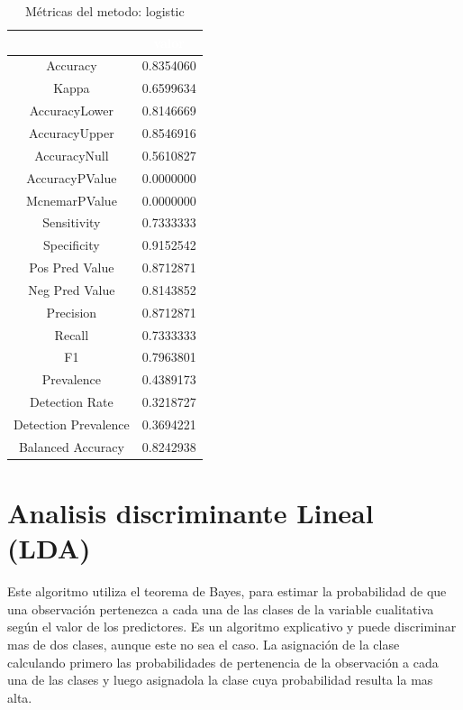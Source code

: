 \documentclass[]{article}
\begin{document}
\begin{table}[!h]

\caption{\label{tab:metricas_logistic}Métricas del metodo: logistic }
\centering
\begin{tabular}[t]{cc}
\toprule
\rowcolor{black}  \multicolumn{1}{c}{\textcolor{white}{\textbf{metricas}}} & \multicolumn{1}{c}{\textcolor{white}{\textbf{valor}}}\\
\midrule
\rowcolor{gray!6}  Accuracy & 0.8354060\\
Kappa & 0.6599634\\
\rowcolor{gray!6}  AccuracyLower & 0.8146669\\
AccuracyUpper & 0.8546916\\
\rowcolor{gray!6}  AccuracyNull & 0.5610827\\
\addlinespace
AccuracyPValue & 0.0000000\\
\rowcolor{gray!6}  McnemarPValue & 0.0000000\\
Sensitivity & 0.7333333\\
\rowcolor{gray!6}  Specificity & 0.9152542\\
Pos Pred Value & 0.8712871\\
\addlinespace
\rowcolor{gray!6}  Neg Pred Value & 0.8143852\\
Precision & 0.8712871\\
\rowcolor{gray!6}  Recall & 0.7333333\\
F1 & 0.7963801\\
\rowcolor{gray!6}  Prevalence & 0.4389173\\
\addlinespace
Detection Rate & 0.3218727\\
\rowcolor{gray!6}  Detection Prevalence & 0.3694221\\
Balanced Accuracy & 0.8242938\\
\bottomrule
\end{tabular}
\end{table}

\hypertarget{analisis-discriminante-lineal-lda}{%
\section{Analisis discriminante Lineal
(LDA)}\label{analisis-discriminante-lineal-lda}}

Este algoritmo utiliza el teorema de Bayes, para estimar la probabilidad
de que una observación pertenezca a cada una de las clases de la
variable cualitativa según el valor de los predictores. Es un algoritmo
explicativo y puede discriminar mas de dos clases, aunque este no sea el
caso. La asignación de la clase calculando primero las probabilidades de
pertenencia de la observación a cada una de las clases y luego
asignadola la clase cuya probabilidad resulta la mas alta.
\end{document}
